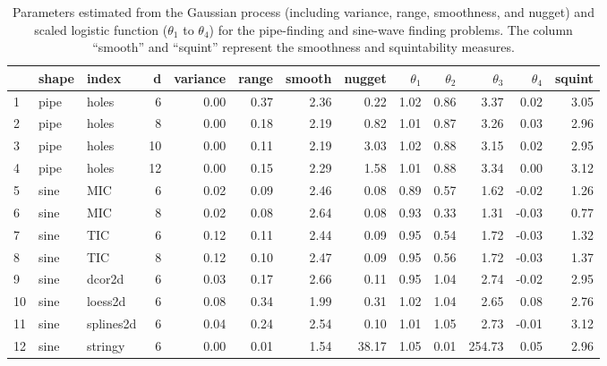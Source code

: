 \documentclass[
  12pt,
]{interact}
\theoremstyle{plain}
\begin{document}
\hypertarget{tbl-smoothness-squintability}{}
\begin{table}
\caption{\label{tbl-smoothness-squintability}Parameters estimated from the Gaussian process (including variance,
range, smoothness, and nugget) and scaled logistic function
(\(\theta_1\) to \(\theta_4\)) for the pipe-finding and sine-wave
finding problems. The column ``smooth'' and ``squint'' represent the
smoothness and squintability measures. }\tabularnewline

\centering\begingroup\fontsize{10}{12}\selectfont

\begin{tabular}{|>{}lll>{}r|rrr>{}r|rrrr>{}r|}
\toprule
  & shape & index & d & variance & range & smooth & nugget & $\theta_1$ & $\theta_2$ & $\theta_3$ & $\theta_4$ & squint\\
\midrule
1 & pipe & holes & 6 & 0.00 & 0.37 & 2.36 & 0.22 & 1.02 & 0.86 & 3.37 & 0.02 & 3.05\\
2 & pipe & holes & 8 & 0.00 & 0.18 & 2.19 & 0.82 & 1.01 & 0.87 & 3.26 & 0.03 & 2.96\\
3 & pipe & holes & 10 & 0.00 & 0.11 & 2.19 & 3.03 & 1.02 & 0.88 & 3.15 & 0.02 & 2.95\\
4 & pipe & holes & 12 & 0.00 & 0.15 & 2.29 & 1.58 & 1.01 & 0.88 & 3.34 & 0.00 & 3.12\\
5 & sine & MIC & 6 & 0.02 & 0.09 & 2.46 & 0.08 & 0.89 & 0.57 & 1.62 & -0.02 & 1.26\\
6 & sine & MIC & 8 & 0.02 & 0.08 & 2.64 & 0.08 & 0.93 & 0.33 & 1.31 & -0.03 & 0.77\\
7 & sine & TIC & 6 & 0.12 & 0.11 & 2.44 & 0.09 & 0.95 & 0.54 & 1.72 & -0.03 & 1.32\\
8 & sine & TIC & 8 & 0.12 & 0.10 & 2.47 & 0.09 & 0.95 & 0.56 & 1.72 & -0.03 & 1.37\\
9 & sine & dcor2d & 6 & 0.03 & 0.17 & 2.66 & 0.11 & 0.95 & 1.04 & 2.74 & -0.02 & 2.95\\
10 & sine & loess2d & 6 & 0.08 & 0.34 & 1.99 & 0.31 & 1.02 & 1.04 & 2.65 & 0.08 & 2.76\\
11 & sine & splines2d & 6 & 0.04 & 0.24 & 2.54 & 0.10 & 1.01 & 1.05 & 2.73 & -0.01 & 3.12\\
12 & sine & stringy & 6 & 0.00 & 0.01 & 1.54 & 38.17 & 1.05 & 0.01 & 254.73 & 0.05 & 2.96\\
\bottomrule
\end{tabular}
\endgroup{}
\end{table}
\end{document}
